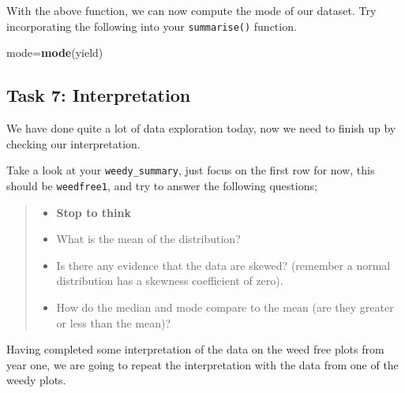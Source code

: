 \documentclass[
]{book}
\newenvironment{Shaded}{\begin{snugshade}}{\end{snugshade}}
\newcommand{\FunctionTok}[1]{\textcolor[rgb]{0.13,0.29,0.53}{\textbf{#1}}}
\newcommand{\NormalTok}[1]{#1}
\newcommand{\OtherTok}[1]{\textcolor[rgb]{0.56,0.35,0.01}{#1}}
\providecommand{\tightlist}{%
  \setlength{\itemsep}{0pt}\setlength{\parskip}{0pt}}
\begin{document}
With the above function, we can now compute the mode of our dataset. Try incorporating the following into your \texttt{summarise()} function.

\begin{Shaded}
\begin{Highlighting}[]
\NormalTok{mode}\OtherTok{=}\FunctionTok{mode}\NormalTok{(yield)}
\end{Highlighting}
\end{Shaded}

\subsection{Task 7: Interpretation}\label{task-7-interpretation}

We have done quite a lot of data exploration today, now we need to finish up by checking our interpretation.

Take a look at your \texttt{weedy\_summary}, just focus on the first row for now, this should be \texttt{weedfree1}, and try to answer the following questions;

\begin{quote}
\begin{itemize}
\tightlist
\item
  \textbf{Stop to think}
\item
  What is the mean of the distribution?
\item
  Is there any evidence that the data are skewed? (remember a normal distribution has a skewness coefficient of zero).
\item
  How do the median and mode compare to the mean (are they greater or less than the mean)?
\end{itemize}
\end{quote}

Having completed some interpretation of the data on the weed free plots from year one, we are going to repeat the interpretation with the data from one of the weedy plots.
\end{document}
